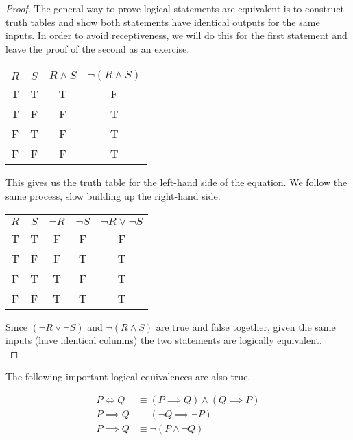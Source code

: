 \begin{proof}
	The general way to prove logical statements are equivalent is to construct truth tables and show both statements have identical outputs for the same inputs. In order to avoid receptiveness, we will do this for the first statement and leave the proof of the second as an exercise.
	
	\vspace{\baselineskip}
	\begin{center}
		\begin{tabular}{cccc}
			$R$ & $S$ & $R \wedge S$ & $\neg(R \wedge S)$ \\
			\midrule
			T & T & T & F \\
			T & F & F & T \\
			F & T & F & T \\
			F & F & F & T \\
		\end{tabular}
	\end{center}
	\vspace{\baselineskip}
	
	This gives us the truth table for the left-hand side of the equation. We follow the same process, slow building up the right-hand side.
	
	\vspace{\baselineskip}
	\begin{center}
		\begin{tabular}{ccccc}
			$R$ & $S$ & $\neg R$ & $\neg S$ & $\neg R \lor \neg S$ \\
			\midrule
			T & T & F & F & F \\
			T & F & F & T & T \\
			F & T & T & F & T \\
			F & F & T & T & T \\
		\end{tabular}
	\end{center}
	
	Since $(\neg R \lor \neg S)$ and $\neg(R \wedge S)$ are true and false together, given the same inputs (have identical columns) the two statements are logically equivalent. \\
\end{proof}
\vspace{\baselineskip}

\vspace{\baselineskip}
\begin{theorem}
	The following important logical equivalences are also true.
	
	\begin{align}
		P \iff Q &\equiv (P \implies Q) \wedge (Q \implies P) \\
		P \implies Q &\equiv (\neg Q \implies \neg P) \\
		P \implies Q &\equiv \neg (P \wedge \neg Q)
	\end{align}
\end{theorem}

